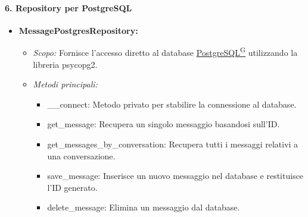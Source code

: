     \paragraph{6. Repository per PostgreSQL}
    \begin{itemize}
        \item \textbf{MessagePostgresRepository:}
        \begin{itemize}
            \item \textit{Scopo:} Fornisce l’accesso diretto al database \href{https://code7crusaders.github.io/docs/PB/documentazione_interna/glossario.html#postgresql}{PostgreSQL\textsuperscript{G}} utilizzando la libreria psycopg2.
            \item \textit{Metodi principali:}
            \begin{itemize}
                \item \_\_connect: Metodo privato per stabilire la connessione al database.
                \item get\_message: Recupera un singolo messaggio basandosi sull’ID.
                \item get\_messages\_by\_conversation: Recupera tutti i messaggi relativi a una conversazione.
                \item save\_message: Inserisce un nuovo messaggio nel database e restituisce l’ID generato.
                \item delete\_message: Elimina un messaggio dal database.
            \end{itemize}
        \end{itemize}
    \end{itemize}

